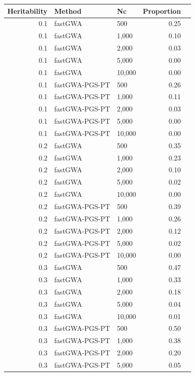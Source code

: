 \documentclass[10pt]{article}
\begin{document}
\begin{table}[!htb]
\centering
{}
\begin{tabular}{rllrr}
  \hline
 Heritability & Method & Nc & Proportion \\ 
  \hline
0.1 & fastGWA & 500 & 0.25 \\ 
  0.1 & fastGWA & 1,000 & 0.10 \\ 
  0.1 & fastGWA & 2,000 & 0.03 \\ 
  0.1 & fastGWA & 5,000 & 0.00 \\ 
  0.1 & fastGWA & 10,000 & 0.00 \\ 
  0.1 & fastGWA-PGS-PT & 500 & 0.26 \\ 
  0.1 & fastGWA-PGS-PT & 1,000 & 0.11 \\ 
  0.1 & fastGWA-PGS-PT & 2,000 & 0.03 \\ 
  0.1 & fastGWA-PGS-PT & 5,000 & 0.00 \\ 
  0.1 & fastGWA-PGS-PT & 10,000 & 0.00 \\ 
  0.2 & fastGWA & 500 & 0.35 \\ 
  0.2 & fastGWA & 1,000 & 0.23 \\ 
  0.2 & fastGWA & 2,000 & 0.10 \\ 
  0.2 & fastGWA & 5,000 & 0.02 \\ 
  0.2 & fastGWA & 10,000 & 0.00 \\ 
  0.2 & fastGWA-PGS-PT & 500 & 0.39 \\ 
  0.2 & fastGWA-PGS-PT & 1,000 & 0.26 \\ 
  0.2 & fastGWA-PGS-PT & 2,000 & 0.12 \\ 
  0.2 & fastGWA-PGS-PT & 5,000 & 0.02 \\ 
  0.2 & fastGWA-PGS-PT & 10,000 & 0.00 \\ 
  0.3 & fastGWA & 500 & 0.47 \\ 
  0.3 & fastGWA & 1,000 & 0.33 \\ 
  0.3 & fastGWA & 2,000 & 0.18 \\ 
  0.3 & fastGWA & 5,000 & 0.04 \\ 
  0.3 & fastGWA & 10,000 & 0.01 \\ 
  0.3 & fastGWA-PGS-PT & 500 & 0.50 \\ 
  0.3 & fastGWA-PGS-PT & 1,000 & 0.38 \\ 
  0.3 & fastGWA-PGS-PT & 2,000 & 0.20 \\ 
  0.3 & fastGWA-PGS-PT & 5,000 & 0.05 \\ 

\end{tabular}
\end{table}
\end{document}

